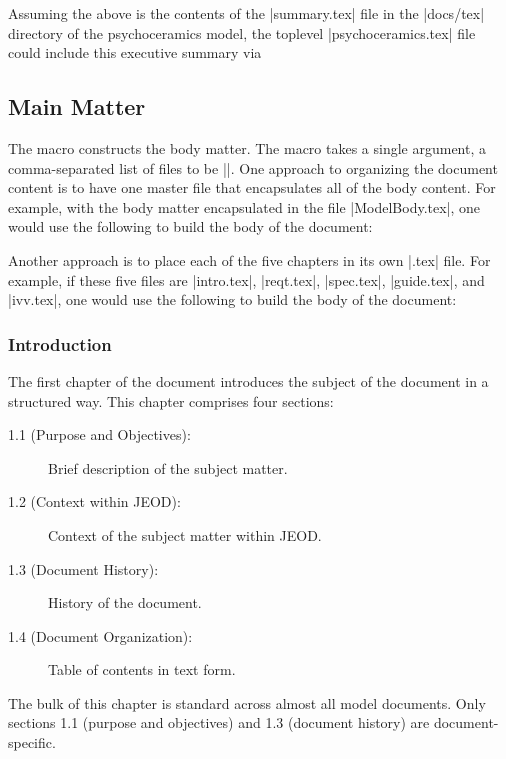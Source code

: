 Assuming the above is the contents of the |summary.tex| file in the |docs/tex|
directory of the psychoceramics model, the toplevel |psychoceramics.tex| file could include this executive summary via
\begin{codeblock}
\end{codeblock}


\subsection{Main Matter}
The  macro constructs the body matter. The macro
takes a single argument, a comma-separated list of files to be ||.
One approach to organizing the document content is to have one master file
that encapsulates all of the body content. For example, with the body
matter encapsulated in the file |ModelBody.tex|, one would use the following
to build the body of the document:
\begin{codeblock}
\end{codeblock}
Another approach is to place each of the five chapters in its own |.tex|
file. For example, if these five files are |intro.tex|, |reqt.tex|, |spec.tex|,
|guide.tex|, and |ivv.tex|, one would use the following
to build the body of the document:
\begin{codeblock}
\end{codeblock}

\subsubsection{Introduction}
\label{sec:chapterone}
The first chapter of the document introduces the subject of the document
in a structured way. This chapter comprises four sections:
\begin{description}
\item[1.1 (Purpose and Objectives):] Brief description of the subject matter.
\item[1.2 (Context within JEOD):] Context of the subject matter within JEOD.
\item[1.3 (Document History):] History of the document.
\item[1.4 (Document Organization):] Table of contents in text form.
\end{description}
The bulk of this chapter is standard across almost all model documents.
Only sections 1.1 (purpose and objectives) and 1.3 (document history) are
document-specific.

